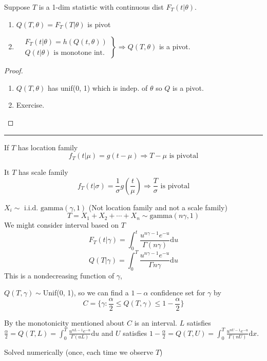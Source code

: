\documentclass[english, 11pt]{article}
\newcommand{\lp}{\left(}
\newcommand{\rp}{\right)}
\begin{document}
\begin{thrm}\label{thrm:69}
Suppose $T$ is a 1-dim statistic with continuous dist $F_T(t|\theta)$.
\begin{enumerate}
\item $Q(T, \theta)=F_T(T|\theta)$ is pivot
\item $\left.\begin{aligned}
&F_T(t|\theta)=h(Q(t, \theta))\\
&Q(t|\theta)\text{ is monotone int.}
\end{aligned}\right\}\Rightarrow Q(T, \theta)$ is a pivot.
\end{enumerate}
\end{thrm}

\begin{proof}
\begin{enumerate}
\item $Q(T, \theta)$ has unif(0, 1) which is indep. of $\theta$ so $Q$ is a pivot.
\item Exercise.
\end{enumerate}
\end{proof}


\hrule
\bigskip

If $T$ has location family
$$
f_T(t|\mu)=g(t-\mu)\Rightarrow T-\mu\text{ is pivotal}
$$

It $T$ has scale family
$$
f_T(t|\sigma)=\frac{1}{\sigma}g\lp\frac{t}{\mu}\rp\Rightarrow\frac{T}{\sigma}\text{ is pivotal}
$$

\begin{exmp}\label{exmp:610}
$X_i\sim\text{ i.i.d. gamma}(\gamma, 1)$ (Not location family and not a scale family)
$$
T=X_1+X_2+\cdots+X_n\sim\text{gamma}(n\gamma, 1)
$$
We might consider interval based on $T$
$$
F_T(t|\gamma)=\int_0^t\frac{u^{n\gamma-1}e^{-u}}{\Gamma(n\gamma)}\mathrm{d}u
$$
$$
Q(T|\gamma)=\int_0^T\frac{u^{n\gamma-1}e^{-u}}{\Gamma{n\gamma}}\mathrm{d}u
$$
This is a nondecreasing function of $\gamma$,

$Q(T, \gamma)\sim$Unif(0, 1), so we can find a $1-\alpha$ confidence set for $\gamma$ by
$$
C=\{\gamma:\frac{\alpha}{2}\leqslant Q(T, \gamma)\leqslant 1-\frac{\alpha}{2}\}
$$

By the monotonicity mentioned about $C$ is an interval. $L$ satisfies $\frac{\alpha}{2}=Q(T, L)=\int_0^T\frac{u^{nL-1}e^{-u}}{\Gamma(uL)}\mathrm{d}u$ and $U$ satisfies $1-\frac{\alpha}{2}=Q(T, U)=\int_0^T\frac{u^{nU-1}e^{-u}}{\Gamma(nU)}\mathrm{d}x$.

Solved numerically (once, each time we observe $T$)
\end{exmp}
\end{document}
